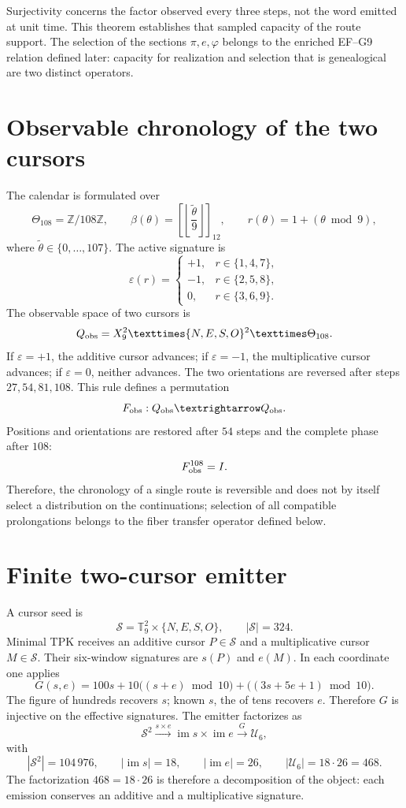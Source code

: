 Surjectivity concerns the factor observed every three steps, not the
word emitted at unit time. This theorem establishes that sampled capacity
of the route support. The selection of the sections
\(\pi,e,\varphi\) belongs to the enriched EF--G9 relation defined
later: capacity for realization and selection that is genealogical are two
distinct operators.

\section{Observable chronology of the two cursors}

The calendar is formulated over
\[
 \Theta_{108}=\mathbb Z/108\mathbb Z,\qquad
 \beta(\theta)=
 \left[\left\lfloor\frac{\widetilde\theta}{9}\right\rfloor\right]_{12},
 \qquad
 r(\theta)=1+(\theta\bmod9),
\]
where \(\widetilde\theta\in\{0,\ldots,107\}\). The active signature is
\[
 \varepsilon(r)=
 \begin{cases}
 +1,&r\in\{1,4,7\},\\
 -1,&r\in\{2,5,8\},\\
 0,&r\in\{3,6,9\}.
 \end{cases}
\]
The observable space of two cursors is
\[
 \mathcal Q_{\rm obs}
 =X_9^2\times\{N,E,S,O\}^2\times\Theta_{108}.
\]
If \(\varepsilon=+1\), the additive cursor advances; if
\(\varepsilon=-1\), the multiplicative cursor advances; if \(\varepsilon=0\), neither advances.
The two orientations are reversed after steps
\(27,54,81,108\). This rule defines a permutation
\[
 F_{\rm obs}:\mathcal Q_{\rm obs}\longrightarrow\mathcal Q_{\rm obs}.
\]
Positions and orientations are restored after \(54\) steps and the complete
phase after \(108\):
\[
 F_{\rm obs}^{108}=I.
\]
Therefore, the chronology of a single route is reversible and does not by itself
select a distribution on the continuations; selection of all
compatible prolongations belongs to the fiber transfer operator
defined below.

\section{Finite two-cursor emitter}

A cursor seed is
\[
 \mathcal S=\mathbb T_9^2\times\{N,E,S,O\},
 \qquad |\mathcal S|=324.
\]
Minimal TPK receives an additive cursor \(P\in\mathcal S\) and a
multiplicative cursor \(M\in\mathcal S\). Their six-window signatures are
\(s(P)\) and \(e(M)\). In each coordinate one applies
\[
 G(s,e)=100s+10\bigl((s+e)\bmod10\bigr)
       +\bigl((3s+5e+1)\bmod10\bigr).
\]
The figure of hundreds recovers \(s\); known \(s\), the of tens recovers
\(e\). Therefore \(G\) is injective on the effective signatures. The emitter
factorizes as
\[
 \mathcal S^2\xrightarrow{s\times e}
 \operatorname{im}s\times\operatorname{im}e
 \xrightarrow{G}\mathcal U_6,
\]
with
\[
 |\mathcal S^2|=104\,976,\qquad
 |\operatorname{im}s|=18,\qquad
 |\operatorname{im}e|=26,\qquad
 |\mathcal U_6|=18\cdot26=468.
\]
The factorization \(468=18\cdot26\) is therefore a decomposition of the
object: each emission conserves an additive and a multiplicative signature.

